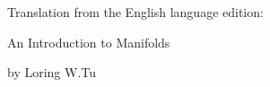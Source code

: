 \documentclass[14pt]{jsarticle}
\begin{document}
Translation from the English language edition:

An Introduction to Manifolds

by Loring W.Tu
\end{document}
